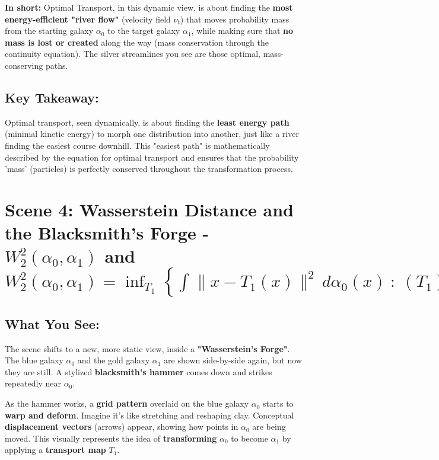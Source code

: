 \documentclass{article}
\begin{document}
\textbf{In short:} Optimal Transport, in this dynamic view, is about finding the \textbf{most energy-efficient "river flow"} (velocity field \( \nu_t \)) that moves probability mass from the starting galaxy \( \alpha_0 \) to the target galaxy \( \alpha_1 \), while making sure that \textbf{no mass is lost or created} along the way (mass conservation through the continuity equation). The silver streamlines you see are those optimal, mass-conserving paths.

\subsection*{Key Takeaway:}

Optimal transport, seen dynamically, is about finding the \textbf{least energy path} (minimal kinetic energy) to morph one distribution into another, just like a river finding the easiest course downhill. This "easiest path" is mathematically described by the equation for optimal transport and ensures that the probability 'mass' (particles) is perfectly conserved throughout the transformation process.

\hrulefill

\section*{Scene 4: Wasserstein Distance and the Blacksmith's Forge - \( W_2^2(\alpha_0, \alpha_1) \) and \( W_2^2(\alpha_0, \alpha_1) = \inf_{T_1} \left\{ \int \|x - T_1(x)\|^2 \, d\alpha_0(x) \ : \ (T_1)_\# \alpha_0 = \alpha_1 \right\} \)}

\subsection*{What You See:}

The scene shifts to a new, more static view, inside a \textbf{"Wasserstein's Forge"}.  The blue galaxy \( \alpha_0 \) and the gold galaxy \( \alpha_1 \) are shown side-by-side again, but now they are still.  A stylized \textbf{blacksmith's hammer} comes down and strikes repeatedly near \( \alpha_0 \).

As the hammer works, a \textbf{grid pattern} overlaid on the blue galaxy \( \alpha_0 \) starts to \textbf{warp and deform}.  Imagine it's like stretching and reshaping clay. Conceptual \textbf{displacement vectors} (arrows) appear, showing how points in \( \alpha_0 \) are being moved.  This visually represents the idea of \textbf{transforming} \( \alpha_0 \) to become \( \alpha_1 \) by applying a \textbf{transport map} \( T_1 \).
\end{document}
